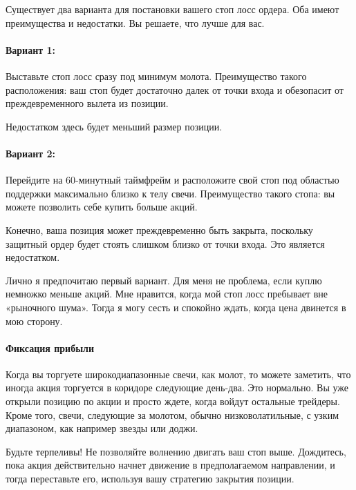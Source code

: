 \documentclass{book}
\begin{document}
Существует два варианта для постановки вашего стоп лосс ордера. Оба
имеют преимущества и недостатки. Вы решаете, что лучше для вас.

\paragraph{Вариант 1:}

Выставьте стоп лосс сразу под минимум молота. Преимущество такого расположения: ваш стоп будет достаточно далек от точки входа и обезопасит от преждевременного вылета из позиции.

Недостатком здесь будет меньший размер позиции.

\paragraph{Вариант 2:}

Перейдите на 60-минутный таймфрейм и расположите свой стоп под областью поддержки максимально близко к телу свечи. Преимущество такого стопа: вы можете позволить себе купить больше акций.

Конечно, ваша позиция может преждевременно быть закрыта, поскольку защитный ордер будет стоять слишком близко от точки входа. Это является недостатком.

Лично я предпочитаю первый вариант. Для меня не проблема, если куплю
немножко меньше акций. Мне нравится, когда мой стоп лосс пребывает вне
«рыночного шума». Тогда я могу сесть и спокойно ждать, когда цена
двинется в мою сторону.

\paragraph{Фиксация прибыли}

Когда вы торгуете широкодиапазонные свечи, как молот, то можете заметить, что иногда акция торгуется в коридоре следующие день-два. Это нормально. Вы уже открыли позицию по акции и просто ждете, когда войдут остальные трейдеры. Кроме того, свечи, следующие за молотом, обычно низковолатильные, с узким диапазоном, как например звезды или доджи.

Будьте терпеливы! Не позволяйте волнению двигать ваш стоп
выше. Дождитесь, пока акция действительно начнет движение в
предполагаемом направлении, и тогда переставьте его, используя вашу
стратегию закрытия позиции.
\end{document}
